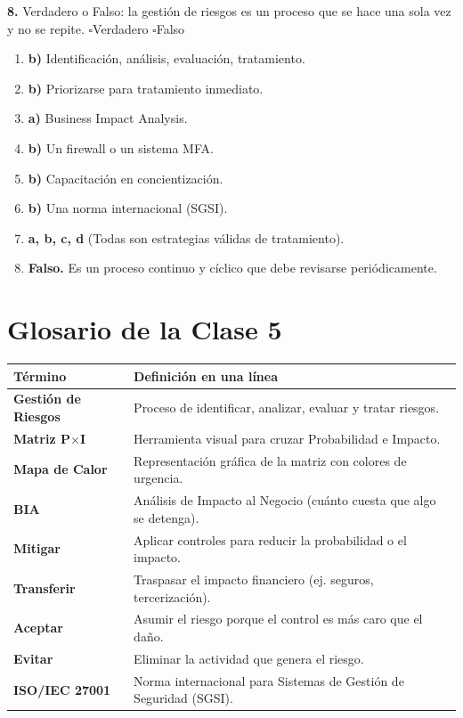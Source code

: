 \documentclass[12pt,a4paper]{article}
\renewcommand{\arraystretch}{1.25}
\newcommand{\checkboxVacio}{$\square$\;}
\newcommand{\checkMark}{\ding{51}}
\begin{document}
\textbf{8.} Verdadero o Falso: la gesti\'on de riesgos es un proceso que se hace una sola vez y no se repite.
\vspace{4pt}
\checkboxVacio Verdadero \qquad \checkboxVacio Falso

\vspace{12pt}
\begin{tcolorbox}[colback=verdeOK!10, colframe=verdeOK,
                  title={\checkMark \; Clave de respuestas}, arc=3mm]
\begin{enumerate}[leftmargin=2em]
  \item \textbf{b)} Identificaci\'on, an\'alisis, evaluaci\'on, tratamiento.
  \item \textbf{b)} Priorizarse para tratamiento inmediato.
  \item \textbf{a)} Business Impact Analysis.
  \item \textbf{b)} Un firewall o un sistema MFA.
  \item \textbf{b)} Capacitaci\'on en concientizaci\'on.
  \item \textbf{b)} Una norma internacional (SGSI).
  \item \textbf{a, b, c, d} (Todas son estrategias v\'alidas de tratamiento).
  \item \textbf{Falso.} Es un proceso continuo y c\'iclico que debe revisarse peri\'odicamente.
\end{enumerate}
\end{tcolorbox}

\newpage
\section{Glosario de la Clase 5}

\renewcommand{\arraystretch}{1.4}
\begin{tabularx}{\textwidth}{>{\bfseries}p{4.5cm}X}
\toprule
\textbf{T\'ermino} & \textbf{Definici\'on en una l\'inea} \\
\midrule
Gesti\'on de Riesgos & Proceso de identificar, analizar, evaluar y tratar riesgos. \\
Matriz P$\times$I & Herramienta visual para cruzar Probabilidad e Impacto. \\
Mapa de Calor & Representaci\'on gr\'afica de la matriz con colores de urgencia. \\
BIA & An\'alisis de Impacto al Negocio (cu\'anto cuesta que algo se detenga). \\
Mitigar & Aplicar controles para reducir la probabilidad o el impacto. \\
Transferir & Traspasar el impacto financiero (ej. seguros, tercerizaci\'on). \\
Aceptar & Asumir el riesgo porque el control es m\'as caro que el da\~no. \\
Evitar & Eliminar la actividad que genera el riesgo. \\
ISO/IEC 27001 & Norma internacional para Sistemas de Gesti\'on de Seguridad (SGSI). \\
\bottomrule
\end{tabularx}
\end{document}
